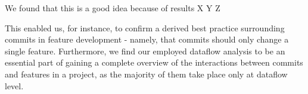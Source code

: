We found that this is a good idea because of results X Y Z

This enabled us, for instance, to confirm a derived best practice surrounding commits in feature development - namely, that commits should only change a single feature.
Furthermore, we find our employed dataflow analysis to be an essential part of gaining a complete overview of the interactions between commits and features in a project, as the majority of them take place only at dataflow level.




\fi 

\vfill

\endgroup

\vfill
